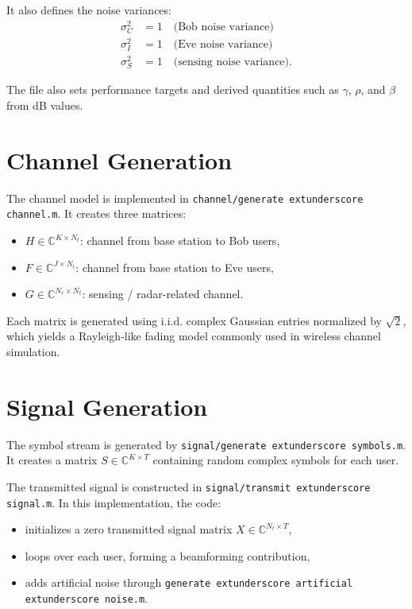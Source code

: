 \documentclass[12pt]{article}
\begin{document}
It also defines the noise variances:
\begin{align*}
\sigma_C^2 &= 1 \quad \text{(Bob noise variance)} \\
\sigma_I^2 &= 1 \quad \text{(Eve noise variance)} \\
\sigma_S^2 &= 1 \quad \text{(sensing noise variance)}.
\end{align*}

The file also sets performance targets and derived quantities such as $\gamma$, $\rho$, and $\beta$ from dB values.

\section{Channel Generation}
The channel model is implemented in \texttt{channel/generate	extunderscore channel.m}. It creates three matrices:

\begin{itemize}[leftmargin=*]
    \item $H \in \mathbb{C}^{K \times N_t}$: channel from base station to Bob users,
    \item $F \in \mathbb{C}^{J \times N_t}$: channel from base station to Eve users,
    \item $G \in \mathbb{C}^{N_r \times N_t}$: sensing / radar-related channel.
\end{itemize}

Each matrix is generated using i.i.d. complex Gaussian entries normalized by $\sqrt{2}$, which yields a Rayleigh-like fading model commonly used in wireless channel simulation.

\section{Signal Generation}
The symbol stream is generated by \texttt{signal/generate	extunderscore symbols.m}. It creates a matrix $S \in \mathbb{C}^{K \times T}$ containing random complex symbols for each user.

The transmitted signal is constructed in \texttt{signal/transmit	extunderscore signal.m}. In this implementation, the code:

\begin{itemize}[leftmargin=*]
    \item initializes a zero transmitted signal matrix $X \in \mathbb{C}^{N_t \times T}$,
    \item loops over each user, forming a beamforming contribution,
    \item adds artificial noise through \texttt{generate	extunderscore artificial	extunderscore noise.m}.
\end{itemize}
\end{document}
